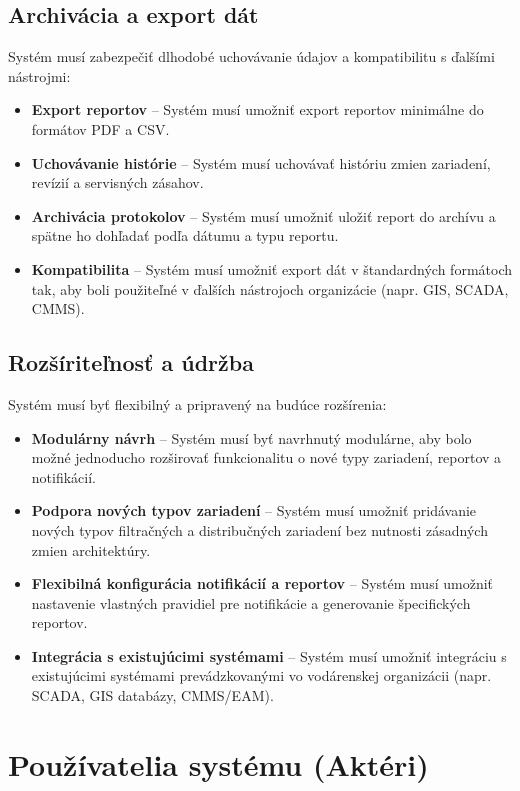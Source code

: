 \subsection{Archivácia a export dát}

Systém musí zabezpečiť dlhodobé uchovávanie údajov a kompatibilitu s ďalšími nástrojmi:

\begin{itemize}
    \item \textbf{Export reportov} -- Systém musí umožniť export reportov minimálne do formátov PDF a CSV.
    \item \textbf{Uchovávanie histórie} -- Systém musí uchovávať históriu zmien zariadení, revízií a servisných zásahov.
    \item \textbf{Archivácia protokolov} -- Systém musí umožniť uložiť report do archívu a spätne ho dohľadať podľa dátumu a typu reportu.
    \item \textbf{Kompatibilita} -- Systém musí umožniť export dát v štandardných formátoch tak, aby boli použiteľné v ďalších nástrojoch organizácie (napr. GIS, SCADA, CMMS).
\end{itemize}

\subsection{Rozšíriteľnosť a údržba}

Systém musí byť flexibilný a pripravený na budúce rozšírenia:

\begin{itemize}
    \item \textbf{Modulárny návrh} -- Systém musí byť navrhnutý modulárne, aby bolo možné jednoducho rozširovať funkcionalitu o nové typy zariadení, reportov a notifikácií.
    \item \textbf{Podpora nových typov zariadení} -- Systém musí umožniť pridávanie nových typov filtračných a distribučných zariadení bez nutnosti zásadných zmien architektúry.
    \item \textbf{Flexibilná konfigurácia notifikácií a reportov} -- Systém musí umožniť nastavenie vlastných pravidiel pre notifikácie a generovanie špecifických reportov.
    \item \textbf{Integrácia s existujúcimi systémami} -- Systém musí umožniť integráciu s existujúcimi systémami prevádzkovanými vo vodárenskej organizácii (napr. SCADA, GIS databázy, CMMS/EAM).
\end{itemize}


\section{Používatelia systému (Aktéri)}

